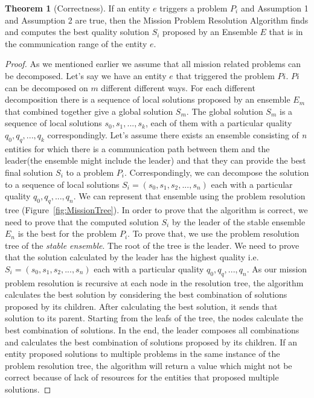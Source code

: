 \documentclass[journal]{IEEEtran}
\theoremstyle{definition}
\newtheorem{theorem}{Theorem}
\begin{document}

\begin{theorem}[Correctness]
If an entity $e$ triggers a problem $P_i$ and Assumption 1 and Assumption 2 are true, then the Mission Problem Resolution Algorithm finds and computes the best quality solution $S_i$  proposed by an Ensemble $E$ that is in the communication range of the entity $e$.
\end{theorem}




\begin{proof}
As we mentioned earlier we assume that all mission related problems can be decomposed. Let's say we have an entity $e$ that triggered the problem $Pi$. $Pi$ can be decomposed on $m$ different different ways. For each different decomposition there is a sequence of local solutions proposed by an ensemble $E_m$  that combined together give a global solution $S_m$. The global solution $S_m$ is a sequence of local solutions $s_0, s_1, ..., s_k$, each of them with a particular quality $q_0, q_q, ..., q_k$ correspondingly. Let's assume there exists an ensemble consisting of \textit{n} entities for which there is a communication path between them and the leader(the ensemble might include the leader) and that they can provide the best final solution $S_i$ to a problem $P_i$. Correspondingly, we can decompose the solution to a sequence of local solutions $S_i=(s_0, s_1, s_2, ..., s_n)$ each with a particular quality  $q_0, q_q, ..., q_n$.  We can represent that ensemble using the problem resolution tree (Figure~\ref{fig:MissionTree}). 
In order to prove that the algorithm is correct, 
we need to prove that the computed solution $S_i$ by the leader of the stable ensemble $E_n$ is the best for the problem $P_i$.
To prove that, we use the problem resolution tree of the \textit{stable ensemble}. The root of the tree is the leader. We need to prove that the solution calculated by the leader has the highest quality i.e. $S_i=(s_0, s_1, s_2, ..., s_n)$ each with a particular quality  $q_0, q_q, ..., q_n$.  
As our mission problem resolution is recursive at 
each node in the resolution tree, the algorithm calculates the best solution by considering the best combination of solutions proposed by its children. After calculating the best solution, it sends that solution to its parent. Starting from the leafs of the tree, the nodes calculate the best combination of solutions. In the end, the leader composes all combinations and calculates the best combination of solutions proposed by its children. If an entity proposed solutions to multiple problems in the same instance of the problem resolution tree, the algorithm will return a value which might not be correct because of lack of resources for the entities that proposed multiple solutions.


\end{proof}
\end{document}
